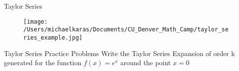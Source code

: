 \documentclass[aspectratio=169]{beamer}
\begin{document}
\begin{frame}{Taylor Series}\label{main1}
    \begin{figure}
        \centering
        \texttt{[image: /Users/michaelkaras/Documents/CU\_Denver\_Math\_Camp/taylor\_series\_example.jpg]}
    \end{figure}
\end{frame}

\begin{frame}{Taylor Series Practice Problems}\label{main1}
	\vspace{-4cm}
Write the Taylor Series Expansion of order k generated for the function \( f(x) = e^{x} \) around the point \( x = 0 \)
\end{frame}
\end{document}
